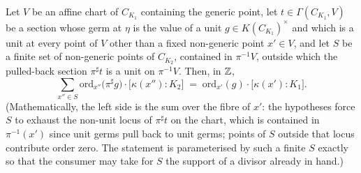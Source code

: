\begin{theorem}
  \label{pa-thm:sum_ordZ_residueDeg_baseFieldTransition}
  \leanok

  Let \(V\) be an affine chart of \(C_{K_1}\) containing the generic point, let
  \(t \in \Gamma(C_{K_1}, V)\) be a section whose germ at \(\eta\) is the value of a
  unit \(g \in K(C_{K_1})^{\times}\) and which is a unit at every point of \(V\) other
  than a fixed non-generic point \(x' \in V\), and let \(S\) be a finite set of
  non-generic points of \(C_{K_2}\), contained in \(\pi^{-1}V\), outside which the
  pulled-back section \(\pi^{\sharp}t\) is a unit on \(\pi^{-1}V\). Then, in \(\mathbb{Z}\),
  \[
    \sum_{x'' \in S} \mathrm{ord}_{x''}\bigl(\pi^{\sharp}g\bigr) \cdot
      \bigl[\kappa(x'') : K_2\bigr]
    \;=\; \mathrm{ord}_{x'}(g) \cdot \bigl[\kappa(x') : K_1\bigr].
  \]
  (Mathematically, the left side is the sum over the fibre of \(x'\): the hypotheses
  force \(S\) to exhaust the non-unit locus of \(\pi^{\sharp}t\) on the chart, which is
  contained in \(\pi^{-1}(x')\) since unit germs pull back to unit germs; points of
  \(S\) outside that locus contribute order zero. The statement is parameterised by
  such a finite \(S\) exactly so that the consumer may take for \(S\) the support of a
  divisor already in hand.)
\end{theorem}

